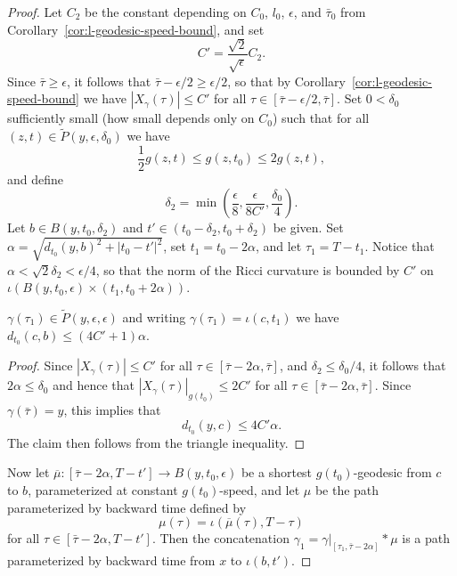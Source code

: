 \begin{proof}
Let $C_2$ be the constant depending on $C_0$, $l_0$, $\epsilon$, and
$\bar\tau_0$ from Corollary~\ref{cor:l-geodesic-speed-bound}, and set
$$C'=\frac{\sqrt{2}}{\sqrt{\epsilon}}C_2.$$
Since $\bar\tau\ge \epsilon$, it follows that
$\bar\tau-\epsilon/2\ge \epsilon/2$, so that by
Corollary~\ref{cor:l-geodesic-speed-bound} we have $|X_\gamma(\tau)|\le C'$ for all
$\tau\in [\bar\tau-\epsilon/2,\bar\tau]$. Set $0<\delta_0$
sufficiently small (how small depends only on $C_0$) such that for
all $(z,t)\in \tilde P(y,\epsilon,\delta_0)$ we have
$$\frac{1}{2}g(z,t)\le g(z,t_0)\le 2g(z,t),$$ and define
$$\delta_2=\min\left(\frac{\epsilon}{8},\frac{\epsilon}{8C'},\frac{\delta_0}{4}\right).$$
 Let $b\in B(y,t_0,\delta_2)$ and $t'\in
(t_0-\delta_2,t_0+\delta_2)$ be given. Set
$\alpha=\sqrt{d_{t_0}(y,b)^2+|t_0-t'|^2}$, set $t_1=t_0-2\alpha$,
and let $\tau_1=T-t_1$. Notice that
$\alpha<\sqrt{2}\delta_2<\epsilon/4$, so that the norm of the Ricci
curvature is bounded by $C'$ on
$\iota(B(y,t_0,\epsilon)\times(t_1,t_0+2\alpha))$.

\begin{claim}\label{claim:l-geodesic-endpoint-close-to-ball}
\label{6.66}
$\gamma(\tau_1)\in \widetilde P(y,\epsilon,\epsilon)$ and writing
$\gamma(\tau_1)=\iota(c,t_1)$ we have $d_{t_0}(c,b)\le
(4C'+1)\alpha$.
\end{claim}

\begin{proof}
Since $|X_\gamma(\tau)|\le C'$ for all $\tau\in
[\bar\tau-2\alpha,\bar\tau]$, and  $\delta_2\le \delta_0/4$, it
follows that $2\alpha\le \delta_0$ and hence that
$|X_\gamma(\tau)|_{g(t_0)}\le 2C'$ for all  $\tau\in
[\bar\tau-2\alpha,\bar\tau]$. Since $\gamma(\bar\tau)=y$, this
implies that
$$d_{t_0}(y,c)\le 4C'\alpha.$$
The claim then follows from the triangle inequality.
\end{proof}

Now let $\overline\mu\colon [\bar\tau-2\alpha,T-t']\to
B(y,t_0,\epsilon)$ be a shortest $g(t_0)$-geodesic from $c$ to $b$,
parameterized at constant $g(t_0)$-speed, and let $\mu$ be the path
parameterized by backward time defined by
$$\mu(\tau)=\iota(\overline\mu(\tau),T-\tau)$$
for all $\tau\in [\bar\tau-2\alpha,T-t']$. Then the concatenation
$\gamma_1=\gamma|_{[\tau_1,\bar\tau-2\alpha]}*\mu$ is a path
parameterized by backward time from $x$ to $\iota(b,t')$.


\end{proof}

